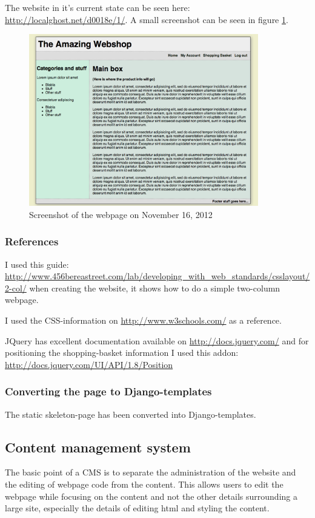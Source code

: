 \documentclass[12pt, a4paper,titlepage]{article}
\begin{document}
The website in it's current state can be seen here: \url{http://localghost.net/d0018e/1/}. 
A small screenshot can be seen in figure \ref{fig:sshot}.
\begin{figure}
\centering
\includegraphics[width=10cm]{Screenshot_2012-11-16.png}
\caption{Screenshot of the webpage on November 16, 2012}
\label{fig:sshot}
\end{figure}

\subsubsection{References}
I used this guide:
\url{http://www.456bereastreet.com/lab/developing_with_web_standards/csslayout/2-col/}
when creating the website, it shows how to do a simple two-column webpage.

I used the CSS-information on \url{http://www.w3schools.com/} as a reference.

JQuery has excellent documentation available on \url{http://docs.jquery.com/}
and for positioning the shopping-basket information I used this addon: 
\url{http://docs.jquery.com/UI/API/1.8/Position}

\subsubsection{Converting the page to Django-templates}
The static skeleton-page has been converted into Django-templates.


\subsection{Content management system}
The basic point of a CMS is to separate the administration of the website and
the editing of webpage code from the content. This allows users to edit the
webpage while focusing on the content and not the other details surrounding
a large site, especially the details of editing html and styling the content.
\end{document}
